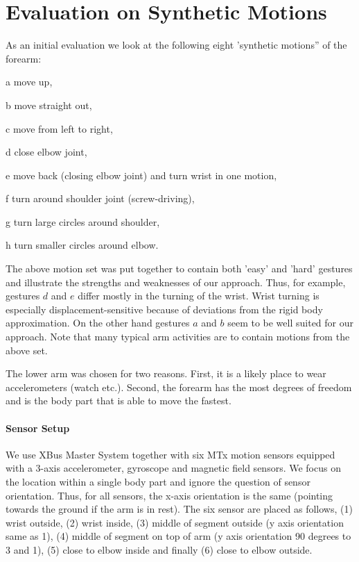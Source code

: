 \section{Evaluation on Synthetic Motions}
\label{sec:experiments}
As an initial evaluation we look at the following eight 'synthetic motions'' of the forearm:
\begin{description*}
 \item[a] move up, 
 \item[b] move straight out,
 \item[c] move from left to right, 
 \item[d] close elbow joint,
 \item[e] move back (closing elbow joint) and turn wrist in one motion,
 \item[f] turn around shoulder joint (screw-driving),
 \item[g] turn large circles around shoulder,
 \item[h] turn smaller circles around elbow.
\end{description*}

The above motion  set was put together  to contain both  'easy' and
'hard' gestures and illustrate the strengths and weaknesses of our
approach. Thus, for example, gestures $d$ and $e$ differ mostly in the turning
of the wrist. Wrist turning is especially displacement-sensitive  because of deviations
from the rigid body approximation. On the other hand gestures $a$ and $b$
seem to be well suited for our approach.  Note that many typical
arm activities are to contain motions from the above set.
  
The lower arm was chosen for two reasons. First, it is a likely
place to wear accelerometers (watch etc.). Second,
the forearm has the most degrees of freedom and
is the body part that is able to move the fastest.
\paragraph{Sensor Setup}
 We use XBus Master System together with six MTx motion sensors equipped 
with a 3-axis accelerometer, gyroscope and magnetic field sensors. 
We focus on the location within a single
body part and ignore the question of sensor orientation. Thus, for all
sensors, the x-axis orientation is the same (pointing towards
the ground if the arm is in rest). 
The six sensor are placed as follows, (1) wrist outside, (2)  wrist inside,
(3) middle of segment  outside (y axis orientation same as 1), (4) middle of segment on top 
of arm (y axis orientation 90 degrees to 3 and 1), (5) close to elbow inside and finally (6) 
close to elbow outside.

